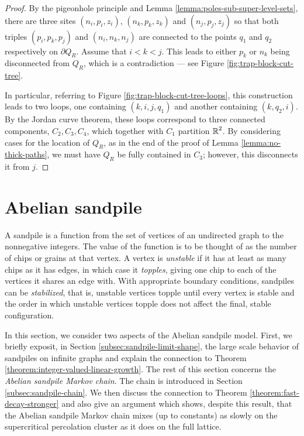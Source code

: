 \documentclass[12pt]{amsart}
\numberwithin{equation}{section}
\begin{document}
\begin{proof}
		
		
		
		
		By the pigeonhole principle and Lemma \ref{lemma:poles-sub-super-level-sets}, there are three sites $(n_i, p_i, z_i)$, $(n_k, p_k, z_k)$ and $(n_j, p_j, z_j)$ so that both triples $(p_i, p_k, p_j)$ and $(n_i, n_k, n_j)$ are connected to the points $q_1$ and $q_2$ respectively on $\partial Q_R$. Assume that $i < k < j$.  This leads to either $p_k$ or $n_k$ being disconnected from $Q_R$, which is a contradiction --- see Figure \ref{fig:trap-block-cut-tree}.
		
		In particular, referring to Figure \ref{fig:trap-block-cut-tree-loops}, this construction leads to two loops, 
		one containing $(k, i, j, q_1)$ and another containing $(k, q_2, i)$. By the Jordan curve theorem, these loops 
		correspond to three connected components, $C_2, C_3, C_4$, which together with $C_1$ partition $\operatorname{\mathbb{R}}^2$. By considering cases for the location of $Q_R$, as in the end of the proof of Lemma \ref{lemma:no-thick-paths}, we must have $Q_R$ be fully contained in $C_3$; however, this disconnects it from $j$. 
	\end{proof}
	
	
	\section{Abelian sandpile} \label{sec:abelian-sandpile}
	A sandpile is a function from the set of vertices of an undirected graph to the nonnegative integers. 
	The value of the function is to be thought of as the number of chips or grains at 
	that vertex. A vertex is {\it unstable} if it has at least as many chips as it has edges, 
	in which case it {\it topples}, giving one chip to each of the vertices it shares an edge with. 
	With appropriate boundary conditions, sandpiles can be {\it stabilized}, that is, unstable vertices topple until every vertex is stable
	and the order in which unstable vertices topple does not affect the final, stable configuration. 
	
	In this section, we consider two aspects of the Abelian sandpile model. First, we briefly exposit, in Section \ref{subsec:sandpile-limit-shape}, the large scale behavior of sandpiles on infinite graphs and explain the connection to Theorem \ref{theorem:integer-valued-linear-growth}. The rest of this section concerns the {\it Abelian sandpile Markov chain}.
	The chain is introduced in Section \ref{subsec:sandpile-chain}. 
	We then discuss the connection to Theorem \ref{theorem:fast-decay-stronger} 
	and also give an argument which shows, despite this result, that the Abelian sandpile Markov chain mixes (up to constants) as slowly on the supercritical percolation cluster as it does on the full lattice. 
	
\end{document}
